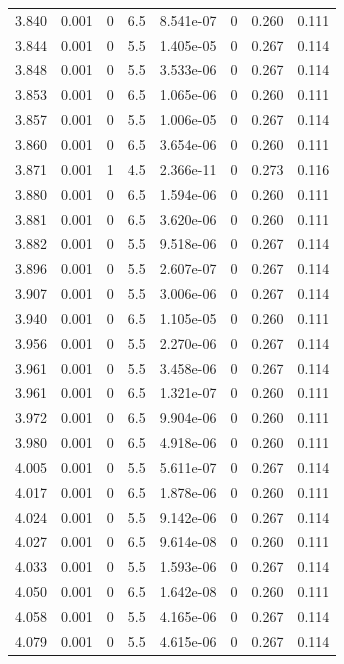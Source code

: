 \documentclass[preview]{standalone}
\begin{document}
{{{{{{{{{\begin{tabular}{L{1.2cm}C{1.2cm} C{0.3cm}C{0.5cm} C{1.4cm}C{1.4cm} C{1.4cm}C{1.4cm}}
  3.840  &  0.001  & 0     & 6.5 &  8.541e-07  & 0  & 0.260 &  0.111   \\ 
  3.844  &  0.001  & 0     & 5.5 &  1.405e-05  & 0  & 0.267 &  0.114   \\ 
  3.848  &  0.001  & 0     & 5.5 &  3.533e-06  & 0  & 0.267 &  0.114   \\ 
  3.853  &  0.001  & 0     & 6.5 &  1.065e-06  & 0  & 0.260 &  0.111   \\ 
  3.857  &  0.001  & 0     & 5.5 &  1.006e-05  & 0  & 0.267 &  0.114   \\ 
  3.860  &  0.001  & 0     & 6.5 &  3.654e-06  & 0  & 0.260 &  0.111   \\ 
  3.871  &  0.001  & 1     & 4.5 &  2.366e-11  & 0  & 0.273 &  0.116   \\ 
  3.880  &  0.001  & 0     & 6.5 &  1.594e-06  & 0  & 0.260 &  0.111   \\ 
  3.881  &  0.001  & 0     & 6.5 &  3.620e-06  & 0  & 0.260 &  0.111   \\ 
  3.882  &  0.001  & 0     & 5.5 &  9.518e-06  & 0  & 0.267 &  0.114   \\ 
  3.896  &  0.001  & 0     & 5.5 &  2.607e-07  & 0  & 0.267 &  0.114   \\ 
  3.907  &  0.001  & 0     & 5.5 &  3.006e-06  & 0  & 0.267 &  0.114   \\ 
  3.940  &  0.001  & 0     & 6.5 &  1.105e-05  & 0  & 0.260 &  0.111   \\ 
  3.956  &  0.001  & 0     & 5.5 &  2.270e-06  & 0  & 0.267 &  0.114   \\ 
  3.961  &  0.001  & 0     & 5.5 &  3.458e-06  & 0  & 0.267 &  0.114   \\ 
  3.961  &  0.001  & 0     & 6.5 &  1.321e-07  & 0  & 0.260 &  0.111   \\ 
  3.972  &  0.001  & 0     & 6.5 &  9.904e-06  & 0  & 0.260 &  0.111   \\ 
  3.980  &  0.001  & 0     & 6.5 &  4.918e-06  & 0  & 0.260 &  0.111   \\ 
  4.005  &  0.001  & 0     & 5.5 &  5.611e-07  & 0  & 0.267 &  0.114   \\ 
  4.017  &  0.001  & 0     & 6.5 &  1.878e-06  & 0  & 0.260 &  0.111   \\ 
  4.024  &  0.001  & 0     & 5.5 &  9.142e-06  & 0  & 0.267 &  0.114   \\ 
  4.027  &  0.001  & 0     & 6.5 &  9.614e-08  & 0  & 0.260 &  0.111   \\ 
  4.033  &  0.001  & 0     & 5.5 &  1.593e-06  & 0  & 0.267 &  0.114   \\ 
  4.050  &  0.001  & 0     & 6.5 &  1.642e-08  & 0  & 0.260 &  0.111   \\ 
  4.058  &  0.001  & 0     & 5.5 &  4.165e-06  & 0  & 0.267 &  0.114   \\ 
  4.079  &  0.001  & 0     & 5.5 &  4.615e-06  & 0  & 0.267 &  0.114   \\ 
\hline 
\end{tabular} 

}}}}}}}}}
\end{document}
